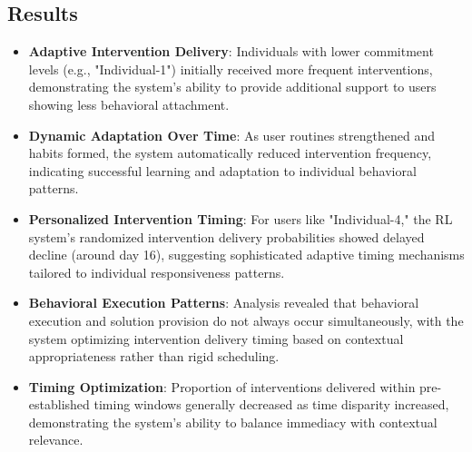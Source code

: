 \subsection*{Results}
\begin{itemize}
    \item \textbf{Adaptive Intervention Delivery}: Individuals with lower commitment levels (e.g., "Individual-1") initially received more frequent interventions, demonstrating the system's ability to provide additional support to users showing less behavioral attachment.
    \item \textbf{Dynamic Adaptation Over Time}: As user routines strengthened and habits formed, the system automatically reduced intervention frequency, indicating successful learning and adaptation to individual behavioral patterns.
    \item \textbf{Personalized Intervention Timing}: For users like "Individual-4," the RL system's randomized intervention delivery probabilities showed delayed decline (around day 16), suggesting sophisticated adaptive timing mechanisms tailored to individual responsiveness patterns.
    \item \textbf{Behavioral Execution Patterns}: Analysis revealed that behavioral execution and solution provision do not always occur simultaneously, with the system optimizing intervention delivery timing based on contextual appropriateness rather than rigid scheduling.
    \item \textbf{Timing Optimization}: Proportion of interventions delivered within pre-established timing windows generally decreased as time disparity increased, demonstrating the system's ability to balance immediacy with contextual relevance.
\end{itemize}

